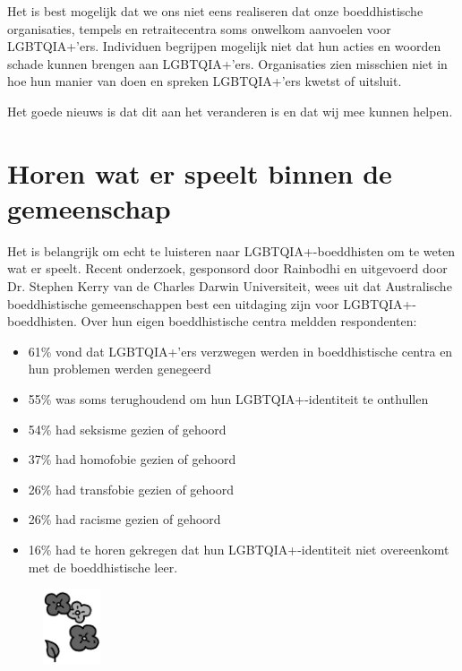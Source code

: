 \documentclass[12pt,openany]{book}
\begin{document}
Het is best mogelijk dat we ons niet eens realiseren dat onze boeddhistische organisaties, tempels en retraitecentra soms onwelkom aanvoelen voor LGBTQIA+’ers. Individuen begrijpen mogelijk niet dat hun acties en woorden schade kunnen brengen aan LGBTQIA+’ers. Organisaties zien misschien niet in hoe hun manier van doen en spreken LGBTQIA+’ers kwetst of uitsluit.  

Het goede nieuws is dat dit aan het veranderen is en dat wij mee kunnen helpen.

\section*{Horen wat er speelt binnen de gemeenschap}

Het is belangrijk om echt te luisteren naar LGBTQIA+-boeddhisten om te weten wat er speelt. Recent onderzoek, gesponsord door Rainbodhi en uitgevoerd door Dr. Stephen Kerry van de Charles Darwin Universiteit, wees uit dat Australische boeddhistische gemeenschappen best een uitdaging zijn voor LGBTQIA+-boeddhisten. Over hun eigen boeddhistische centra meldden respondenten:

\begin{itemize}
\setlength\itemsep{-0.3em}
  \item 61\% vond dat LGBTQIA+’ers verzwegen werden in boeddhistische centra en hun problemen werden genegeerd
  \item 55\% was soms terughoudend om hun LGBTQIA+-identiteit te onthullen
  \item 54\% had seksisme gezien of gehoord
  \item 37\% had homofobie gezien of gehoord
  \item 26\% had transfobie gezien of gehoord
  \item 26\% had racisme gezien of gehoord
  \item 16\% had te horen gekregen dat hun LGBTQIA+-identiteit niet overeenkomt met de boeddhistische leer.
\end{itemize}

\begin{figure}
    \centering
    \includegraphics[width=0.15\textwidth]{2bw4.png}
\end{figure}
\end{document}
